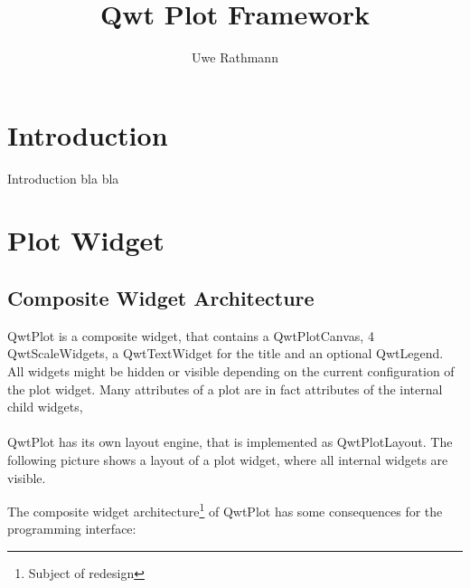 \documentclass[12pt,a4paper]{book}
\author{Uwe Rathmann}
\title{Qwt Plot Framework}
\begin{document}
\maketitle
\pagestyle{headings}

\tableofcontents

\chapter{Introduction}

Introduction bla bla

\chapter{Plot Widget}

\section{Composite Widget Architecture}

QwtPlot is a composite widget, that contains a QwtPlotCanvas, 
4 QwtScaleWidgets, a QwtTextWidget for the title and an optional QwtLegend. 
All widgets might be hidden or visible depending on the current configuration 
of the plot widget. Many attributes of a plot are in fact 
attributes of the internal child widgets,
\\
\\
QwtPlot has its own layout engine, that is implemented as QwtPlotLayout. 
The following picture shows a layout of a plot widget, where all internal widgets are visible.

\begin{center}

\end{center}

\bigskip

\begin{center}

\end{center}

The composite widget architecture\footnote{Subject of redesign} 
of QwtPlot has some consequences for the programming interface:
\end{document}
